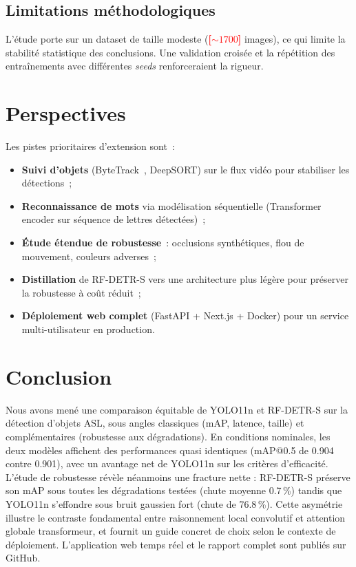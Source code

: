 \documentclass[conference]{IEEEtran}
\newcommand{\TODO}[1]{\textcolor{red}{\textbf{[#1]}}}
\begin{document}
\subsection{Limitations méthodologiques}

L'étude porte sur un dataset de taille modeste (\TODO{$\sim 1700$} images), ce qui limite la stabilité statistique des conclusions. Une validation croisée et la répétition des entraînements avec différentes \textit{seeds} renforceraient la rigueur.

\section{Perspectives}

Les pistes prioritaires d'extension sont~:
\begin{itemize}
\item \textbf{Suivi d'objets} (ByteTrack~\cite{zhang2022bytetrack}, DeepSORT) sur le flux vidéo pour stabiliser les détections~;
\item \textbf{Reconnaissance de mots} via modélisation séquentielle (Transformer encoder sur séquence de lettres détectées)~;
\item \textbf{Étude étendue de robustesse}~: occlusions synthétiques, flou de mouvement, couleurs adverses~;
\item \textbf{Distillation} de RF-DETR-S vers une architecture plus légère pour préserver la robustesse à coût réduit~;
\item \textbf{Déploiement web complet} (FastAPI + Next.js + Docker) pour un service multi-utilisateur en production.
\end{itemize}

\section{Conclusion}

Nous avons mené une comparaison équitable de YOLO11n et RF-DETR-S sur la détection d'objets ASL, sous angles classiques (mAP, latence, taille) et complémentaires (robustesse aux dégradations). En conditions nominales, les deux modèles affichent des performances quasi identiques (mAP@0.5 de 0.904 contre 0.901), avec un avantage net de YOLO11n sur les critères d'efficacité. L'étude de robustesse révèle néanmoins une fracture nette : RF-DETR-S préserve son mAP sous toutes les dégradations testées (chute moyenne 0.7\,\%) tandis que YOLO11n s'effondre sous bruit gaussien fort (chute de 76.8\,\%). Cette asymétrie illustre le contraste fondamental entre raisonnement local convolutif et attention globale transformeur, et fournit un guide concret de choix selon le contexte de déploiement. L'application web temps réel et le rapport complet sont publiés sur GitHub.
\end{document}
